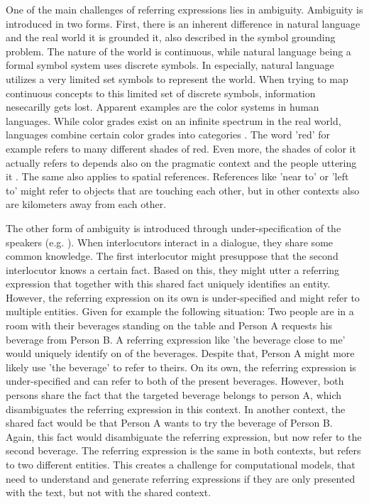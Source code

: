 One of the main challenges of referring expressions lies in ambiguity.
Ambiguity is introduced in two forms.
First, there is an inherent difference in natural language and the real world it is grounded it, also described in the symbol grounding problem.
The nature of the world is continuous, while natural language being a formal symbol system uses discrete symbols.
In especially, natural language utilizes a very limited set symbols to represent the world.
When trying to map continuous concepts to this limited set of discrete symbols, information nesecarilly gets lost.
Apparent examples are the color systems in human languages.
While color grades exist on an infinite spectrum in the real world, languages combine certain color grades into categories \citep{Zaslavsky2018}.
The word 'red' for example refers to many different shades of red.
Even more, the shades of color it actually refers to depends also on the pragmatic context and the people uttering it \citep{Monroe2017}.
The same also applies to spatial references.
References like 'near to' or 'left to' might refer to objects that are touching each other, but in other contexts also are kilometers away from each other.

The other form of ambiguity is introduced through under-specification of the speakers (e.g. \citet{Dobnik2021}).
When interlocutors interact in a dialogue, they share some common knowledge.
The first interlocutor might presuppose that the second interlocutor knows a certain fact.
Based on this, they might utter a referring expression that together with this shared fact uniquely identifies an entity.
However, the referring expression on its own is under-specified and might refer to multiple entities.
Given for example the following situation:
Two people are in a room with their beverages standing on the table and Person A requests his beverage from Person B.
A referring expression like 'the beverage close to me' would uniquely identify on of the beverages.
Despite that, Person A might more likely use 'the beverage' to refer to theirs.
On its own, the referring expression is under-specified and can refer to both of the present beverages.
However, both persons share the fact that the targeted beverage belongs to person A, which disambiguates the referring expression in this context.
In another context, the shared fact would be that Person A wants to try the beverage of Person B.
Again, this fact would disambiguate the referring expression, but now refer to the second beverage.
The referring expression is the same in both contexts, but refers to two different entities.
This creates a challenge for computational models, that need to understand and generate referring expressions if they are only presented with the text, but not with the shared context.

